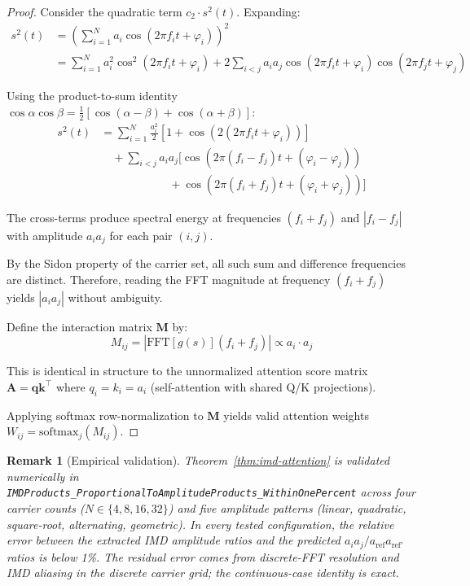 \documentclass[11pt]{article}
\newtheorem{remark}[theorem]{Remark}
\begin{document}
\begin{proof}
Consider the quadratic term $c_2 \cdot s^2(t)$. Expanding:
\begin{align}
s^2(t) &= \left(\sum_{i=1}^{N} a_i \cos(2\pi f_i t + \varphi_i)\right)^2 \\
&= \sum_{i=1}^{N} a_i^2 \cos^2(2\pi f_i t + \varphi_i)
   + 2\sum_{i<j} a_i a_j \cos(2\pi f_i t + \varphi_i)\cos(2\pi f_j t + \varphi_j)
\end{align}

Using the product-to-sum identity $\cos\alpha\cos\beta = \frac{1}{2}[\cos(\alpha-\beta) + \cos(\alpha+\beta)]$:
\begin{align}
s^2(t) &= \sum_{i=1}^{N} \frac{a_i^2}{2}[1 + \cos(2(2\pi f_i t + \varphi_i))] \\
&\quad + \sum_{i<j} a_i a_j [\cos(2\pi(f_i - f_j)t + (\varphi_i - \varphi_j)) \\
&\qquad\qquad\qquad + \cos(2\pi(f_i + f_j)t + (\varphi_i + \varphi_j))]
\end{align}

The cross-terms produce spectral energy at frequencies $(f_i + f_j)$ and
$|f_i - f_j|$ with amplitude $a_i a_j$ for each pair $(i, j)$.

By the Sidon property of the carrier set, all such sum and difference
frequencies are distinct. Therefore, reading the FFT magnitude at
frequency $(f_i + f_j)$ yields $|a_i a_j|$ without ambiguity.

Define the interaction matrix $\mathbf{M}$ by:
\begin{equation}
M_{ij} = |\text{FFT}[g(s)](f_i + f_j)| \propto a_i \cdot a_j
\end{equation}

This is identical in structure to the unnormalized attention score
matrix $\mathbf{A} = \mathbf{q}\mathbf{k}^\top$ where $q_i = k_i = a_i$
(self-attention with shared Q/K projections).

Applying softmax row-normalization to $\mathbf{M}$ yields valid
attention weights $W_{ij} = \text{softmax}_j(M_{ij})$.
\end{proof}

\begin{remark}[Empirical validation]
Theorem~\ref{thm:imd-attention} is validated numerically in
\texttt{IMDProducts\_ProportionalToAmplitudeProducts\_WithinOnePercent}
across four carrier counts ($N \in \{4, 8, 16, 32\}$) and five amplitude
patterns (linear, quadratic, square-root, alternating, geometric). In every
tested configuration, the relative error between the extracted IMD amplitude
ratios and the predicted $a_i a_j / a_{\text{ref}} a_{\text{ref}'}$ ratios is
below 1\%. The residual error comes from discrete-FFT resolution and IMD
aliasing in the discrete carrier grid; the continuous-case identity is
exact.
\end{remark}
\end{document}
